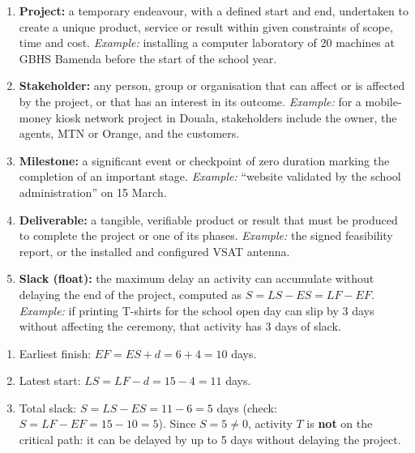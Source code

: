 \documentclass[11pt]{article}
\begin{document}
\begin{corrige}
\begin{enumerate}
\item \textbf{Project:} a temporary endeavour, with a defined start and end, undertaken to create a unique product, service or result within given constraints of scope, time and cost. \emph{Example:} installing a computer laboratory of 20 machines at GBHS Bamenda before the start of the school year.
\item \textbf{Stakeholder:} any person, group or organisation that can affect or is affected by the project, or that has an interest in its outcome. \emph{Example:} for a mobile-money kiosk network project in Douala, stakeholders include the owner, the agents, MTN or Orange, and the customers.
\item \textbf{Milestone:} a significant event or checkpoint of zero duration marking the completion of an important stage. \emph{Example:} ``website validated by the school administration'' on 15 March.
\item \textbf{Deliverable:} a tangible, verifiable product or result that must be produced to complete the project or one of its phases. \emph{Example:} the signed feasibility report, or the installed and configured VSAT antenna.
\item \textbf{Slack (float):} the maximum delay an activity can accumulate without delaying the end of the project, computed as $S = LS - ES = LF - EF$. \emph{Example:} if printing T-shirts for the school open day can slip by 3 days without affecting the ceremony, that activity has 3 days of slack.
\end{enumerate}
\end{corrige}

\begin{corrige}
\begin{enumerate}
\item Earliest finish: $EF = ES + d = 6 + 4 = 10$ days.
\item Latest start: $LS = LF - d = 15 - 4 = 11$ days.
\item Total slack: $S = LS - ES = 11 - 6 = 5$ days (check: $S = LF - EF = 15 - 10 = 5$). Since $S = 5 \neq 0$, activity $T$ is \textbf{not} on the critical path: it can be delayed by up to 5 days without delaying the project.
\end{enumerate}
\end{corrige}
\end{document}
